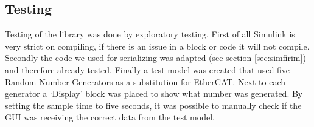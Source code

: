 \subsection{Testing}
Testing of the library was done by exploratory testing. First of all Simulink is very strict on compiling, if there is an issue in a block or code it will not compile. Secondly the code we used for serializing was adapted (see section \ref{sec:simfirim})  and therefore already tested. Finally a test model was created that used five Random Number Generators as a substitution for EtherCAT. Next to each generator a `Display' block was placed to show what number was generated. By setting the sample time to five seconds, it was possible to manually check if the GUI was receiving the correct data from the test model.